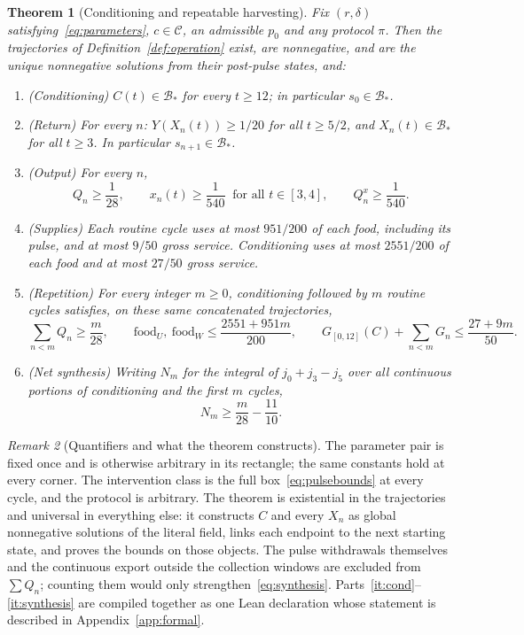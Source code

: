 \documentclass[11pt,a4paper]{article}
\theoremstyle{plain}
\newtheorem{theorem}{Theorem}[section]
\theoremstyle{definition}
\theoremstyle{remark}
\newtheorem{remark}[theorem]{Remark}
\newcommand{\Adm}{\mathcal C}
\newcommand{\Bstar}{\mathcal B_*}
\newcommand{\Pnet}{N}
\begin{document}
\begin{theorem}[Conditioning and repeatable harvesting]\label{thm:main}
Fix $(r,\delta)$ satisfying~\eqref{eq:parameters}, $c\in\Adm$, an admissible $p_0$ and any protocol $\pi$. Then the trajectories of Definition~\ref{def:operation} exist, are nonnegative, and are the unique nonnegative solutions from their post-pulse states, and:
\begin{enumerate}[label=(\alph*)]
\item\label{it:cond} (Conditioning) $C(t)\in\Bstar$ for every $t\ge12$; in particular $s_0\in\Bstar$.
\item\label{it:return} (Return) For every $n$: $Y(X_n(t))\ge1/20$ for all $t\ge5/2$, and $X_n(t)\in\Bstar$ for all $t\ge3$. In particular $s_{n+1}\in\Bstar$.
\item\label{it:output} (Output) For every $n$,
\begin{equation}\label{eq:output}
Q_n\ge\frac1{28},\qquad x_n(t)\ge\frac1{540}\ \text{ for all }t\in[3,4],\qquad Q^{x}_n\ge\frac1{540}.
\end{equation}
\item\label{it:supply} (Supplies) Each routine cycle uses at most $951/200$ of each food, including its pulse, and at most $9/50$ gross service. Conditioning uses at most $2551/200$ of each food and at most $27/50$ gross service.
\item\label{it:cumulative} (Repetition) For every integer $m\ge0$, conditioning followed by $m$ routine cycles satisfies, on these same concatenated trajectories,
\begin{equation}\label{eq:cumulative}
\sum_{n<m}Q_n\ge\frac m{28},\qquad
\text{food}_U,\ \text{food}_W\le\frac{2551+951m}{200},\qquad
G_{[0,12]}(C)+\sum_{n<m}G_n\le\frac{27+9m}{50}.
\end{equation}
\item\label{it:synthesis} (Net synthesis) Writing $\Pnet_m$ for the integral of $j_0+j_3-j_5$ over all continuous portions of conditioning and the first $m$ cycles,
\begin{equation}\label{eq:synthesis}
\Pnet_m\ge\frac m{28}-\frac{11}{10}.
\end{equation}
\end{enumerate}
\end{theorem}

\begin{remark}[Quantifiers and what the theorem constructs]
The parameter pair is fixed once and is otherwise arbitrary in its rectangle; the same constants hold at every corner. The intervention class is the full box~\eqref{eq:pulsebounds} at every cycle, and the protocol is arbitrary. The theorem is existential in the trajectories and universal in everything else: it constructs $C$ and every $X_n$ as global nonnegative solutions of the literal field, links each endpoint to the next starting state, and proves the bounds on those objects. The pulse withdrawals themselves and the continuous export outside the collection windows are excluded from $\sum Q_n$; counting them would only strengthen~\eqref{eq:synthesis}. Parts~\ref{it:cond}--\ref{it:synthesis} are compiled together as one Lean declaration whose statement is described in Appendix~\ref{app:formal}.
\end{remark}
\end{document}
